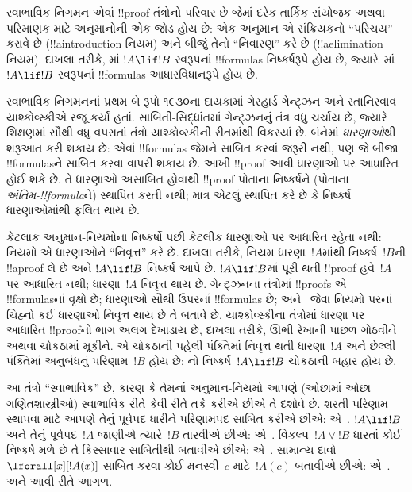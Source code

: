 \documentclass[../../../include/open-logic-section]{subfiles}
\begin{document}


સ્વાભાવિક નિગમન એવાં !!{proof}
તંત્રોનો પરિવાર છે જેમાં દરેક
તાર્કિક સંયોજક અથવા પરિમાણક
માટે અનુમાનોની એક જોડ હોય છે:
એક અનુમાન એ સંક્રિયકનો
``પરિચય'' કરાવે છે
(!!a{introduction} નિયમ)
અને બીજું તેનો
``નિવારણ'' કરે છે
(!!a{elimination} નિયમ).
દાખલા તરીકે, \Intro{\lif}માં
$!A \lif !B$ સ્વરૂપનાં
!!{formula}s નિષ્કર્ષરૂપે હોય છે,
જ્યારે~\Elim{\lif}માં
$!A \lif !B$ સ્વરૂપનાં
!!{formula}s
આધારવિધાનરૂપે હોય છે.

સ્વાભાવિક નિગમનનાં પ્રથમ બે
રૂપો ૧૯૩૦ના દાયકામાં ગેરહાર્ડ
ગેન્ટ્ઝન અને સ્તાનિસ્વાવ
યાશ્કોવ્સ્કીએ રજૂ કર્યાં હતાં.
સાબિતી-સિદ્ધાંતમાં ગેન્ટ્ઝનનું
તંત્ર વધુ ચર્ચાય છે, જ્યારે
શિક્ષણમાં સૌથી વધુ વપરાતાં
તંત્રો યાશ્કોવ્સ્કીની રીતમાંથી
વિકસ્યાં છે. બંનેમાં
\emph{ધારણાઓ}થી શરૂઆત
કરી શકાય છે: એવાં
!!{formula}s જેમને
સાબિત કરવાં જરૂરી
નથી, પણ જે બીજા
!!{formula}sને સાબિત
કરવા વાપરી શકાય છે.
આખી !!{proof} આવી
ધારણાઓ પર આધારિત હોઈ
શકે છે. તે ધારણાઓ
અસાબિત હોવાથી !!{proof}
પોતાના નિષ્કર્ષને
(પોતાના \emph{અંતિમ-!!{formula}}ને)
સ્થાપિત કરતી નથી;
માત્ર એટલું સ્થાપિત
કરે છે કે નિષ્કર્ષ
ધારણાઓમાંથી ફલિત થાય છે.

કેટલાક અનુમાન-નિયમોના
નિષ્કર્ષો પછી કેટલીક ધારણાઓ
પર આધારિત રહેતા નથી:
નિયમો એ ધારણાઓને
``નિવૃત્ત'' કરે છે.
દાખલા તરીકે,
\Intro{\lif} નિયમ
ધારણા~$!A$માંથી
નિષ્કર્ષ~$!B$ની
!!a{proof} લે છે અને
$!A \lif !B$ નિષ્કર્ષ આપે છે.
$!A \lif !B$માં પૂરી થતી
!!{proof} હવે~$!A$ પર
આધારિત નથી; ધારણા~$!A$
નિવૃત્ત થાય છે.
ગેન્ટ્ઝનના તંત્રોમાં
!!{proof}s એ
!!{formula}sનાં વૃક્ષો છે;
ધારણાઓ સૌથી ઉપરનાં
!!{formula}s છે;
અને~\Intro{\lif} જેવા
નિયમો પરનાં ચિહ્નો કઈ
ધારણાઓ નિવૃત્ત થાય છે
તે બતાવે છે.
યાશ્કોવ્સ્કીના તંત્રોમાં
ધારણા પર આધારિત
!!{proof}નો ભાગ અલગ
દેખાડાય છે, દાખલા તરીકે,
ઊભી રેખાની પાછળ
ગોઠવીને અથવા ચોકઠામાં
મૂકીને. એ ચોકઠાની
પહેલી પંક્તિમાં નિવૃત્ત
થતી ધારણા~$!A$ અને
છેલ્લી પંક્તિમાં
અનુબંધનું પરિણામ~$!B$
હોય છે; \Intro{\lif}નો
નિષ્કર્ષ~$!A \lif !B$
ચોકઠાની બહાર હોય છે.

આ તંત્રો ``સ્વાભાવિક''
છે, કારણ કે તેમનાં
અનુમાન-નિયમો આપણે
(ઓછામાં ઓછા ગણિતશાસ્ત્રીઓ)
સ્વાભાવિક રીતે કેવી રીતે
તર્ક કરીએ છીએ તે દર્શાવે છે.
શરતી પરિણામ સ્થાપવા માટે
આપણે તેનું પૂર્વપદ
ધારીને પરિણામપદ સાબિત
કરીએ છીએ: એ~\Intro{\lif}.
$!A \lif !B$ અને તેનું
પૂર્વપદ~$!A$ જાણીએ
ત્યારે~$!B$ તારવીએ છીએ:
એ~\Elim{\lif}.
વિકલ્પ~$!A \lor !B$
ધારતાં કોઈ નિષ્કર્ષ
મળે છે તે કિસ્સાવાર
સાબિતીથી બતાવીએ છીએ:
એ~\Elim{\lor}.
સામાન્ય દાવો
$\lforall[x][!A(x)]$
સાબિત કરવા કોઈ મનસ્વી~$c$
માટે~$!A(c)$ બતાવીએ છીએ:
એ~\Intro{\lforall}.
અને આવી રીતે આગળ.
\end{document}
